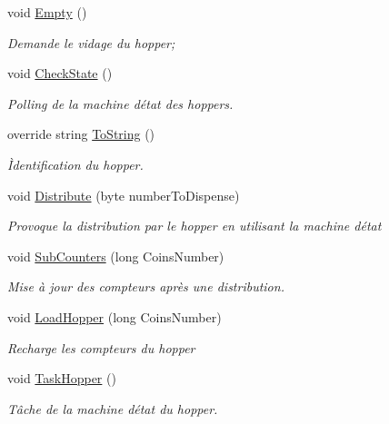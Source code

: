 \begin{DoxyCompactItemize}
void \mbox{\hyperlink{class_device_library_1_1_c_hopper_ae47327ae35305769239ffd9922081d57}{Empty}} ()
\begin{DoxyCompactList}\small\item\em Demande le vidage du hopper; \end{DoxyCompactList}\item 
void \mbox{\hyperlink{class_device_library_1_1_c_hopper_a43760bb1d6cac2e875eb6ddb7615a90a}{Check\+State}} ()
\begin{DoxyCompactList}\small\item\em Polling de la machine d\textquotesingle{}état des hoppers. \end{DoxyCompactList}\item 
override string \mbox{\hyperlink{class_device_library_1_1_c_hopper_a25b43f1aafc2b92432077743ce07b39c}{To\+String}} ()
\begin{DoxyCompactList}\small\item\em Ìdentification du hopper. \end{DoxyCompactList}\item 
void \mbox{\hyperlink{class_device_library_1_1_c_hopper_a1161f40b938189953cede1eb8a844672}{Distribute}} (byte number\+To\+Dispense)
\begin{DoxyCompactList}\small\item\em Provoque la distribution par le hopper en utilisant la machine d\textquotesingle{}état \end{DoxyCompactList}\item 
void \mbox{\hyperlink{class_device_library_1_1_c_hopper_a2fa0700c53416b25e7cad3dd626a1753}{Sub\+Counters}} (long Coins\+Number)
\begin{DoxyCompactList}\small\item\em Mise à jour des compteurs après une distribution. \end{DoxyCompactList}\item 
void \mbox{\hyperlink{class_device_library_1_1_c_hopper_aa36d7fe76437086718eee22bc8189d3b}{Load\+Hopper}} (long Coins\+Number)
\begin{DoxyCompactList}\small\item\em Recharge les compteurs du hopper \end{DoxyCompactList}\item 
void \mbox{\hyperlink{class_device_library_1_1_c_hopper_a254a7cbf891dec96caf087ab56512bc8}{Task\+Hopper}} ()
\begin{DoxyCompactList}\small\item\em Tâche de la machine d\textquotesingle{}état du hopper. \end{DoxyCompactList}\end{DoxyCompactItemize}
